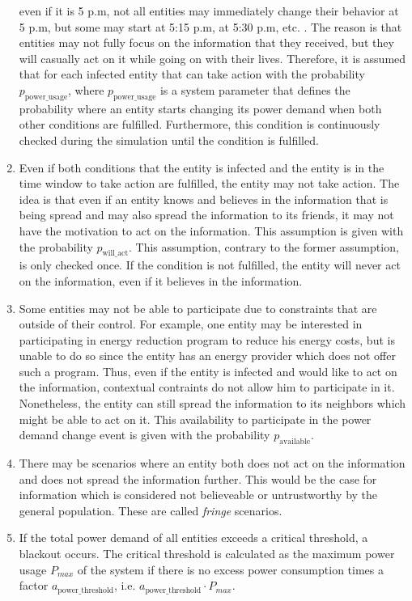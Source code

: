 \begin{enumerate}
    even if it is 5 p.m, not all entities may immediately change their 
    behavior at 5 p.m, but some may start at 5:15 p.m, at 5:30 p.m, etc. .
    The reason is that entities may not fully focus on the information
    that they received, but they will casually act on it while going 
    on with their lives. 
    Therefore, it is assumed that for each infected entity that can 
    take action with the probability $p_{\mathrm{power\_usage}}$, where 
    $p_{\mathrm{power\_usage}}$ is a system
    parameter that defines the probability where an entity
    starts changing its power demand when both other conditions are
    fulfilled. Furthermore, this condition is continuously checked 
    during the simulation until the condition is fulfilled.
    \item Even if both conditions that
    the entity is infected and the entity is in the time window 
    to take action are fulfilled, the entity may not take action.
    The idea is that even if an entity knows and believes
    in the information that is being spread and may also spread
    the information to its friends, it may not have the motivation 
    to act on the information.
    This assumption is given with the probability $p_{\mathrm{will\_act}}$.
    This assumption, contrary to the former assumption, is only
    checked once. If the condition is not fulfilled, the 
    entity will never act on the information, even if 
    it believes in the information.
    \item Some entities may not be able to participate due 
    to constraints that are outside of their control. For example, 
    one entity may be interested in participating in energy reduction
    program to reduce his energy costs, but is unable to do so since 
    the entity has an energy provider which does not offer such a program.
    Thus, even if the entity is infected and would like to act on the 
    information, contextual contraints do not allow him to participate in it.
    Nonetheless, the entity can still spread the information to its neighbors
    which might be able to act on it. 
    This availability to participate in the power demand change event is 
    given with the probability $p_{\mathrm{available}}$.
    \item There may be scenarios where 
    an entity both does not act on the information and does not 
    spread the information further. This would be the case for information
    which is considered not believeable or untrustworthy by the general
    population. These are called \textit{fringe} scenarios.
    \item If the total power demand of all entities exceeds a 
    critical threshold, a blackout occurs. The critical threshold
    is calculated as the maximum power usage $P_{max}$ 
    of the system if there is no excess power consumption times 
    a factor $a_{\mathrm{power\_threshold}}$, i.e.
    $a_{\mathrm{power\_threshold}} \cdot P_{max}$.
\end{enumerate}

